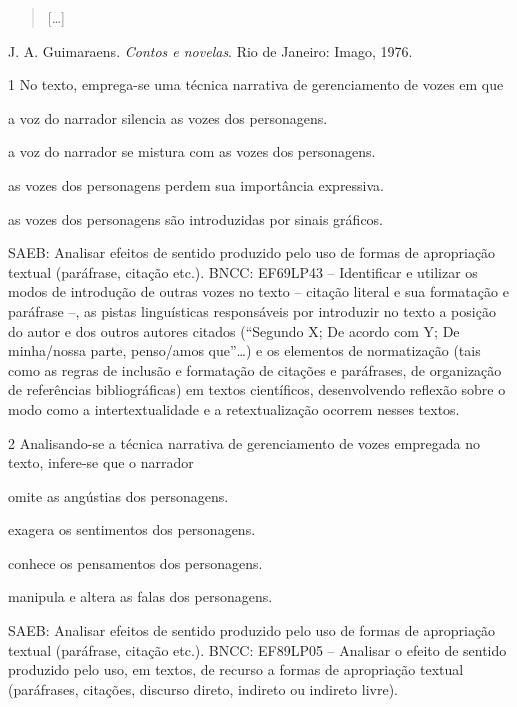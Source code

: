 \begin{quote}
{[}\ldots{]}
\end{quote}

J. A. Guimaraens. \emph{Contos e novelas}. Rio de Janeiro: Imago, 1976.

\num{1} No texto, emprega-se uma técnica narrativa de gerenciamento de
vozes em que

\begin{escolha}
\item a voz do narrador silencia as vozes dos personagens.

\item a voz do narrador se mistura com as vozes dos personagens.

\item as vozes dos personagens perdem sua importância expressiva.

\item as vozes dos personagens são introduzidas por sinais gráficos.
\end{escolha}

SAEB: Analisar efeitos de sentido produzido pelo uso de formas de
apropriação textual (paráfrase, citação etc.). BNCC: EF69LP43 --
Identificar e utilizar os modos de introdução de outras vozes no texto
-- citação literal e sua formatação e paráfrase --, as pistas
linguísticas responsáveis por introduzir no texto a posição do autor e
dos outros autores citados (``Segundo X; De acordo com Y; De minha/nossa
parte, penso/amos que''\ldots) e os elementos de normatização (tais como
as regras de inclusão e formatação de citações e paráfrases, de
organização de referências bibliográficas) em textos científicos,
desenvolvendo reflexão sobre o modo como a intertextualidade e a
retextualização ocorrem nesses textos.

\num{2} Analisando-se a técnica narrativa de gerenciamento de vozes
empregada no texto, infere-se que o narrador

\begin{escolha}
\item omite as angústias dos personagens.
\item exagera os sentimentos dos personagens.
\item conhece os pensamentos dos personagens.
\item manipula e altera as falas dos personagens.
\end{escolha}

SAEB: Analisar efeitos de sentido produzido pelo uso de formas de
apropriação textual (paráfrase, citação etc.). BNCC: EF89LP05 --
Analisar o efeito de sentido produzido pelo uso, em textos, de recurso a
formas de apropriação textual (paráfrases, citações, discurso direto,
indireto ou indireto livre).

